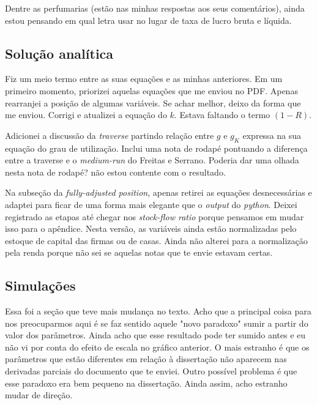 \documentclass[11pt]{article}
\begin{document}
Dentre as perfumarias (estão nas minhas respostas aos seus comentários), ainda estou pensando em qual letra usar no lugar de taxa de lucro bruta e líquida.

\subsection{Solução analítica}
\label{sec:orge62f0c0}

Fiz um meio termo entre as suas equações e as minhas anteriores. Em um primeiro momento, priorizei aquelas equações que me enviou no PDF. Apenas rearranjei a posição de algumas variáveis. Se achar melhor, deixo da forma que me enviou. Corrigi e atualizei a equação do \(k\). Estava faltando o termo \((1-R)\).

Adicionei a discussão da \emph{traverse} partindo relação entre \(g\) e \(g_K\) expressa na sua equação do grau de utilização. Inclui uma nota de rodapé pontuando a diferença entre a traverse e o \emph{medium-run} do Freitas e Serrano. Poderia dar uma olhada nesta nota de rodapé? não estou contente com o resultado.

Na subseção da \emph{fully-adjusted position}, apenas retirei as equações desnecessárias e adaptei para ficar de uma forma mais elegante que o \emph{output} do \emph{python}. Deixei registrado as etapas até chegar nos \emph{stock-flow ratio} porque pensamos em mudar isso para o apêndice. Nesta versão, as variáveis ainda estão normalizadas pelo estoque de capital das firmas ou de casas. Ainda não alterei para a normalização pela renda porque não sei se aquelas notas que te envie estavam certas.

\subsection{Simulações}
\label{sec:org8497d01}

Essa foi a seção que teve mais mudança no texto. Acho que a principal coisa para nos preocuparmos aqui é se faz sentido aquele "novo paradoxo" sumir a partir do valor dos parâmetros. Ainda acho que esse resultado pode ter sumido antes e eu não vi por conta do efeito de escala no gráfico anterior. O mais estranho é que os parâmetros que estão diferentes em relação à dissertação não aparecem nas derivadas parciais do documento que te enviei. Outro possível problema é que esse paradoxo era bem pequeno na dissertação. Ainda assim, acho estranho mudar de direção.
\end{document}

